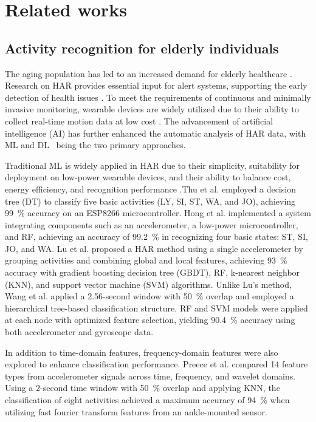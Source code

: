 \documentclass[journal,twoside,web]{ieeecolor}
\begin{document}
\section{Related works}\label{Related works}
\subsection{Activity recognition for elderly individuals} 
The aging population has led to an increased demand for elderly healthcare \cite{Elder_Falling_2019,Fall_Elder2022,Fall_Elder2019, Thu2022, MobiFall_Yi_2024}. Research on HAR provides essential input for alert systems, supporting the early detection of health issues \cite{DaoHieu2022,Thu2022}. To meet the requirements of continuous and minimally invasive monitoring, wearable devices are widely utilized due to their ability to collect real-time motion data at low cost \cite{HongNhung2023,ViManhTuyen2024,TinyML2023}. The advancement of artificial intelligence (AI) has further enhanced the automatic analysis of HAR data, with ML \cite{MLforMicrocontroller2022,RF_ForestFires2024} and DL~\cite{HAR_CNN_2025,HAR_CNN_2024,HAR_DL_sensor2023,HAR_DCT_deeplearning2023,DeepLearningHAR2022,HAR_CNN_2022} being the two primary approaches.

Traditional ML is widely applied in HAR due to their simplicity, suitability for deployment on low-power wearable devices, and their ability to balance cost, energy efficiency, and recognition performance \cite{HongNhung2023,DaoHieu2022}.Thu et al. \cite{Thu2022} employed a decision tree (DT) to classify five basic activities (LY, SI, ST, WA, and JO), achieving 99~\% accuracy on an ESP8266 microcontroller. Hong et al. \cite{HongNhung2023} implemented a system integrating components such as an accelerometer, a low-power microcontroller, and RF, achieving an accuracy of 99.2~\% in recognizing four basic states: ST, SI, JO, and WA. Lu et al. \cite{Lu2020} proposed a HAR method using a single accelerometer by grouping activities and combining global and local features, achieving 93~\% accuracy with gradient boosting decision tree (GBDT), RF, k-nearest neighbor (KNN), and support vector machine (SVM) algorithms. Unlike Lu's method, Wang et al. \cite{Wang2018} applied a 2.56-second window with 50~\% overlap and employed a hierarchical tree-based classification structure. RF and SVM models were applied at each node with optimized feature selection, yielding 90.4~\% accuracy using both accelerometer and gyroscope data.

In addition to time-domain features, frequency-domain features were also explored to enhance classification performance. Preece et al. \cite{preece2008_leutheuser2013_Lu2020} compared 14 feature types from accelerometer signals across time, frequency, and wavelet domains. Using a 2-second time window with 50~\% overlap and applying KNN, the classification of eight activities achieved a maximum accuracy of 94~\% when utilizing fast fourier transform features from an ankle-mounted sensor.
\end{document}
